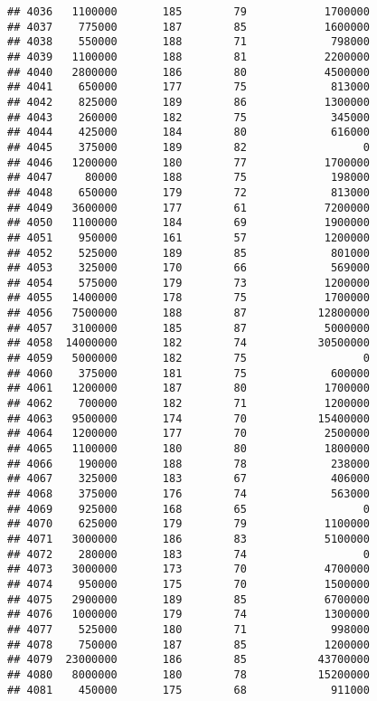 \documentclass[
]{article}
\begin{document}
\begin{verbatim}
## 4036   1100000       185        79            1700000
## 4037    775000       187        85            1600000
## 4038    550000       188        71             798000
## 4039   1100000       188        81            2200000
## 4040   2800000       186        80            4500000
## 4041    650000       177        75             813000
## 4042    825000       189        86            1300000
## 4043    260000       182        75             345000
## 4044    425000       184        80             616000
## 4045    375000       189        82                  0
## 4046   1200000       180        77            1700000
## 4047     80000       188        75             198000
## 4048    650000       179        72             813000
## 4049   3600000       177        61            7200000
## 4050   1100000       184        69            1900000
## 4051    950000       161        57            1200000
## 4052    525000       189        85             801000
## 4053    325000       170        66             569000
## 4054    575000       179        73            1200000
## 4055   1400000       178        75            1700000
## 4056   7500000       188        87           12800000
## 4057   3100000       185        87            5000000
## 4058  14000000       182        74           30500000
## 4059   5000000       182        75                  0
## 4060    375000       181        75             600000
## 4061   1200000       187        80            1700000
## 4062    700000       182        71            1200000
## 4063   9500000       174        70           15400000
## 4064   1200000       177        70            2500000
## 4065   1100000       180        80            1800000
## 4066    190000       188        78             238000
## 4067    325000       183        67             406000
## 4068    375000       176        74             563000
## 4069    925000       168        65                  0
## 4070    625000       179        79            1100000
## 4071   3000000       186        83            5100000
## 4072    280000       183        74                  0
## 4073   3000000       173        70            4700000
## 4074    950000       175        70            1500000
## 4075   2900000       189        85            6700000
## 4076   1000000       179        74            1300000
## 4077    525000       180        71             998000
## 4078    750000       187        85            1200000
## 4079  23000000       186        85           43700000
## 4080   8000000       180        78           15200000
## 4081    450000       175        68             911000

\end{verbatim}
\end{document}
